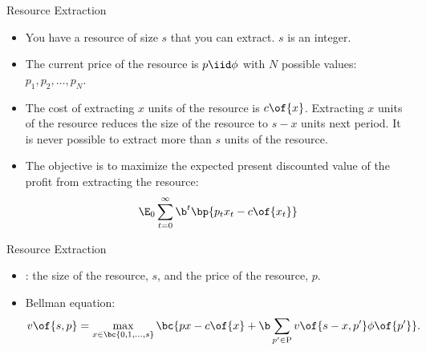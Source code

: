 \documentclass[11pt,xcolor={dvipsnames},aspectratio=159,hyperref={pdftex,pdfpagemode=UseNone,hidelinks,pdfdisplaydoctitle=true},usepdftitle=false]{beamer}
\begin{document}
\begin{frame}
\end{frame}


\begin{frame}{Resource Extraction}
    \begin{itemize}
    \item You have a resource of size $s$ that you can extract. $s$ is an integer. 
    \item The current price of the resource is $p \iid \phi$ with $N$ possible values: $p_1, p_2, \ldots, p_N$. 
    \item The cost of extracting $x$ units of the resource is $c\of{x}$. Extracting $x$ units of the resource reduces the size of the resource to $s-x$ units next period. It is never possible to extract more than $s$ units of the resource.
    \item The objective is to maximize the expected present discounted value of the profit from extracting the resource:
    \begin{align*}
        \E_0 \sum_{t=0}^\infty \b^t \bp{p_t x_t - c\of{x_t}} 
    \end{align*}
\end{itemize}
\end{frame}


\begin{frame}{Resource Extraction}
    \begin{itemize}
    \item {}: the size of the resource, $s$, and the price of the resource, $p$.
    \item Bellman equation: 
    \begin{align*}
        v\of{s,p} = \max_{x\in\bc{0,1,\ldots,s}} \bc{p x - c\of{x} + \b \sum_{p^\prime \in \text{P}} v\of{s-x,p^\prime} \phi\of{p^\prime}}.
    \end{align*}
\end{itemize}
\end{frame}


\begin{frame}
\end{frame}
\end{document}
